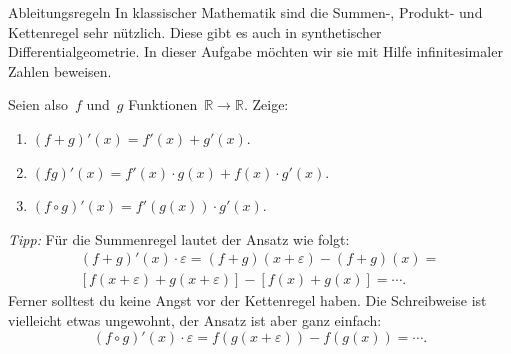 \documentclass{zirkelblatt}
\newcommand{\RR}{\mathbb{R}}
\theoremstyle{definition}
\theoremstyle{plain}
\theoremstyle{remark}
\begin{document}
\begin{aufgabeShaded}{Ableitungsregeln}
In klassischer Mathematik sind die Summen-, Produkt- und Kettenregel sehr
nützlich. Diese gibt es auch in synthetischer Differentialgeometrie. In dieser
Aufgabe möchten wir sie mit Hilfe infinitesimaler Zahlen beweisen.

Seien also~$f$ und~$g$ Funktionen~$\RR \to \RR$. Zeige:
\begin{enumerate}
\item $(f+g)'(x) = f'(x) + g'(x)$.
\item $(fg)'(x) = f'(x) \cdot g(x) + f(x) \cdot g'(x)$.
\item $(f \circ g)'(x) = f'(g(x)) \cdot g'(x)$.
\end{enumerate}

\emph{Tipp:} Für die Summenregel lautet der Ansatz wie folgt:
\begin{multline*}(f+g)'(x) \cdot \varepsilon =
  (f+g)(x + \varepsilon) - (f+g)(x) = \\
  [f(x+\varepsilon) + g(x+\varepsilon)] - [f(x) + g(x)] = \cdots. \end{multline*}
Ferner solltest du keine Angst vor der Kettenregel haben. Die Schreibweise ist
vielleicht etwas ungewohnt, der Ansatz ist aber ganz einfach:
\[ (f \circ g)'(x) \cdot \varepsilon =
  f(g(x + \varepsilon)) - f(g(x)) = \cdots. \]
\end{aufgabeShaded}
\end{document}
